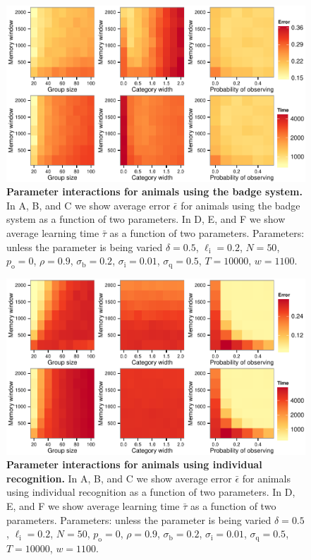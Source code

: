 \begin{figure}[h]
\includegraphics[width=.8\textwidth]{figures/parameter_interactions_badge.pdf}
\caption{\sffamily\small\textbf{Parameter interactions for animals using the badge system.}
In A, B, and C we show average error $\bar{\epsilon}$ for animals using the badge system as a function of two parameters. In D, E, and F we show average learning time $\bar{\tau}$ as a function of two parameters. Parameters: unless the parameter is being varied $\delta = 0.5$, $\ell_\text{i}=0.2$, $N=50$, $p_\text{o}=0$, $\rho=0.9$, $\sigma_\text{b}=0.2$, $\sigma_\text{i}=0.01$, $\sigma_\text{q}=0.5$, $T=10000$, $w=1100$.}
\label{interactions_badge}
\end{figure}

\begin{figure}[h]
\includegraphics[width=.8\textwidth]{figures/parameter_interactions_indiv.pdf}
\caption{\sffamily\small\textbf{Parameter interactions for animals using individual recognition.}
In A, B, and C we show average error $\bar{\epsilon}$ for animals using individual recognition as a function of two parameters. In D, E, and F we show average learning time $\bar{\tau}$ as a function of two parameters. Parameters: unless the parameter is being varied $\delta = 0.5$, $\ell_\text{i}=0.2$, $N=50$, $p_\text{o}=0$, $\rho=0.9$, $\sigma_\text{b}=0.2$, $\sigma_\text{i}=0.01$, $\sigma_\text{q}=0.5$, $T=10000$, $w=1100$.}
\label{interactions_indiv}
\end{figure}


